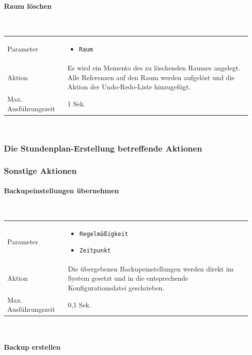 \documentclass[fontsize=12pt,paper=a4,twoside]{scrartcl}
\begin{document}
\paragraph{Raum löschen}\mbox{}\\
\begin{tabularx}{\textwidth}{p{4cm}X}
Parameter & \begin{itemize}[itemsep=0pt, leftmargin = 0.5cm]
			\item \texttt{Raum}
			\end{itemize}\\
Aktion & Es wird ein Memento des zu löschenden Raumes angelegt. Alle Referenzen auf den Raum werden aufgelöst und die Aktion der Undo-Redo-Liste hinzugefügt. \\
Max. Ausführungszeit & 1 Sek. 
\end{tabularx}\\

\subsubsection{Die Stundenplan-Erstellung betreffende Aktionen}

\subsubsection{Sonstige Aktionen}

\paragraph{Backupeinstellungen übernehmen}\mbox{}\\

\begin{tabularx}{\textwidth}{p{4cm}X}
Parameter & \begin{itemize}[itemsep=0pt, leftmargin = 0.5cm]
			\item \texttt{Regelmäßigkeit}
			\item \texttt{Zeitpunkt}
			\end{itemize}\\
Aktion & Die übergebenen Backupeinstellungen werden direkt im System gesetzt und in die entsprechende Konfigurationsdatei geschrieben. \\
Max. Ausführungszeit & 0,1 Sek. 
\end{tabularx}\\



\paragraph{Backup erstellen}\mbox{}\\
\end{document}
